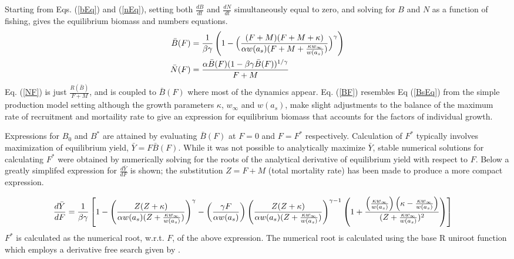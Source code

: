 %
Starting from Eqs. (\ref{bEq}) and (\ref{nEq}), setting both $\frac{dB}{dt}$
and $\frac{dN}{dt}$ simultaneously equal to zero, and solving for $B$ and $N$
as a function of fishing, gives the equilibrium biomass and numbers equations.
%
\begin{align}
\bar{B}(F) &= \frac{1}{\beta\gamma} \left( 1 - \Big(\frac{(F + M) (F + M + \kappa)}{\alpha w(a_s)(F + M + \frac{\kappa w_\infty}{w(a_s)})}\Big)^\gamma\right) \label{BF}\\
\bar{N}(F) &= \frac{\alpha\bar{B}(F)(1-\beta\gamma\bar{B}(F))^{1/\gamma}}{F+M} \label{NF}
\end{align}
%
Eq. (\ref{NF}) is just $\frac{R(\bar{B})}{F+M}$, and is coupled to $\bar{B}(F)$
where most of the dynamics appear. Eq. (\ref{BF}) resembles Eq (\ref{BsEq})
from the simple production model setting although the growth parameters
$\kappa$, $w_\infty$ and $w(a_s)$, make slight adjustments to the balance of the
maximum rate of recruitment and mortaility rate to give an expression for
equilibrium biomass that accounts for the factors of individual growth.

%
Expressions for $B_0$ and $B^*$ are attained by evaluating $\bar{B}(F)$ at
$F=0$ and $F=F^*$ respectively. Calculation of $F^*$ typically involves %
maximization of equilibrium yield, \mbox{$\bar{Y} = F\bar{B}(F)$.} While it was not
possible to analytically maximize $\bar{Y}$, stable numerical solutions for
calculating $F^*$ were obtained by numerically solving for the roots of the
analytical derivative of equilibrium yield with respect to $F$. Below a greatly
simplifed expression for $\frac{d \bar{Y}}{dF}$ is shown; the substitution
$Z=F+M$ (total mortality rate) has been made to produce a more compact expression.

%
\vspace{-0.75cm}
\begingroup
\scriptsize
\begin{align}
\frac{d \bar{Y}}{dF} &= \frac{1}{\beta\gamma}\left[ 1 - \left(\frac{Z(Z+\kappa)}{\alpha w(a_s)(Z+\frac{\kappa w_\infty}{w(a_s)})}\right)^\gamma - \left(\frac{\gamma F}{\alpha w(a_s)}\right) \left(\frac{Z(Z+\kappa)}{\alpha w(a_s)(Z+\frac{\kappa w_\infty}{w(a_s)})}\right)^{\gamma-1} \left( 1 + \frac{\left(\frac{\kappa w_\infty}{w(a_s)}\right)\left(\kappa-\frac{\kappa w_\infty}{w(a_s)}\right)}{(Z+\frac{\kappa w_\infty}{w(a_s)})^2} \right) \right]\label{dBdFS}
\end{align}
\endgroup
%
$F^*$ is calculated as the numerical root, w.r.t. $F$, of the above expression.
The numerical root is calculated using the base R uniroot function which
employs a derivative free search given by \cite{brent_chapter_1973}. %

